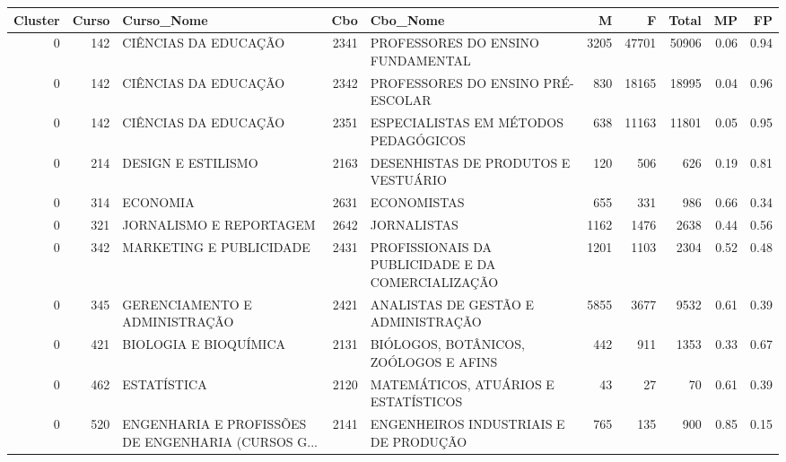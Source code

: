 \begin{tabular}{rrlrlrrrrr}
\toprule
 Cluster &  Curso &                                         Curso\_Nome &  Cbo &                                          Cbo\_Nome &    M &     F &  Total &   MP &   FP \\
\midrule
       0 &    142 &                               CIÊNCIAS DA EDUCAÇÃO & 2341 &                 PROFESSORES DO ENSINO FUNDAMENTAL & 3205 & 47701 &  50906 & 0.06 & 0.94 \\
       0 &    142 &                               CIÊNCIAS DA EDUCAÇÃO & 2342 &                 PROFESSORES DO ENSINO PRÉ-ESCOLAR &  830 & 18165 &  18995 & 0.04 & 0.96 \\
       0 &    142 &                               CIÊNCIAS DA EDUCAÇÃO & 2351 &              ESPECIALISTAS EM MÉTODOS PEDAGÓGICOS &  638 & 11163 &  11801 & 0.05 & 0.95 \\
       0 &    214 &                                 DESIGN E ESTILISMO & 2163 &              DESENHISTAS DE PRODUTOS E  VESTUÁRIO &  120 &   506 &    626 & 0.19 & 0.81 \\
       0 &    314 &                                           ECONOMIA & 2631 &                                       ECONOMISTAS &  655 &   331 &    986 & 0.66 & 0.34 \\
       0 &    321 &                            JORNALISMO E REPORTAGEM & 2642 &                                       JORNALISTAS & 1162 &  1476 &   2638 & 0.44 & 0.56 \\
       0 &    342 &                            MARKETING E PUBLICIDADE & 2431 & PROFISSIONAIS DA PUBLICIDADE E DA COMERCIALIZAÇÃO & 1201 &  1103 &   2304 & 0.52 & 0.48 \\
       0 &    345 &                      GERENCIAMENTO E ADMINISTRAÇÃO & 2421 &               ANALISTAS DE GESTÃO E ADMINISTRAÇÃO & 5855 &  3677 &   9532 & 0.61 & 0.39 \\
       0 &    421 &                              BIOLOGIA E BIOQUÍMICA & 2131 &             BIÓLOGOS, BOTÂNICOS, ZOÓLOGOS E AFINS &  442 &   911 &   1353 & 0.33 & 0.67 \\
       0 &    462 &                                        ESTATÍSTICA & 2120 &              MATEMÁTICOS, ATUÁRIOS E ESTATÍSTICOS &   43 &    27 &     70 & 0.61 & 0.39 \\
       0 &    520 & ENGENHARIA E PROFISSÕES DE ENGENHARIA (CURSOS G... & 2141 &             ENGENHEIROS INDUSTRIAIS E DE PRODUÇÃO &  765 &   135 &    900 & 0.85 & 0.15 \\

\end{tabular}
